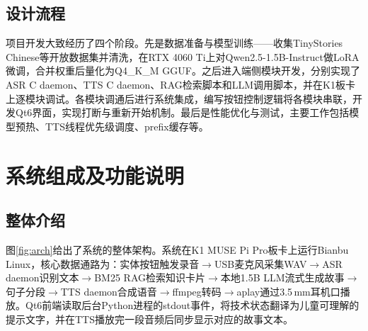\documentclass[lettersize,journal]{IEEEtran}
\begin{document}
\subsection{设计流程}

项目开发大致经历了四个阶段。先是数据准备与模型训练——收集TinyStories Chinese等开放数据集并清洗，在RTX 4060 Ti上对Qwen2.5-1.5B-Instruct做LoRA微调，合并权重后量化为Q4\_K\_M GGUF。之后进入端侧模块开发，分别实现了ASR C daemon、TTS C daemon、RAG检索脚本和LLM调用脚本，并在K1板卡上逐模块调试。各模块调通后进行系统集成，编写按钮控制逻辑将各模块串联，开发Qt6界面，实现打断与重新开始机制。最后是性能优化与测试，主要工作包括模型预热、TTS线程优先级调度、prefix缓存等。

\section{系统组成及功能说明}
\label{sec:system}

\subsection{整体介绍}

图\ref{fig:arch}给出了系统的整体架构。系统在K1 MUSE Pi Pro板卡上运行Bianbu Linux，核心数据通路为：实体按钮触发录音$\rightarrow$USB麦克风采集WAV$\rightarrow$ASR daemon识别文本$\rightarrow$BM25 RAG检索知识卡片$\rightarrow$本地1.5B LLM流式生成故事$\rightarrow$句子分段$\rightarrow$TTS daemon合成语音$\rightarrow$ffmpeg转码$\rightarrow$aplay通过3.5\,mm耳机口播放。Qt6前端读取后台Python进程的stdout事件，将技术状态翻译为儿童可理解的提示文字，并在TTS播放完一段音频后同步显示对应的故事文本。
\end{document}
